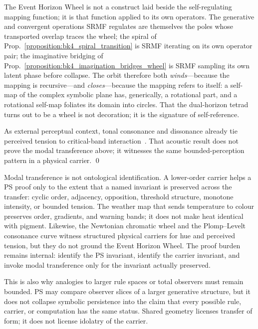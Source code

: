\begin{scholium}
\label{scholium:bk4_wheel_is_srmf_on_itself}
The Event Horizon Wheel is not a construct laid beside the self-regulating mapping
function; it is that function applied to its own operators. The generative and
convergent operations SRMF regulates are themselves the poles whose transported
overlap traces the wheel; the spiral of
Prop.~\ref{proposition:bk4_spiral_transition} is SRMF iterating on its own operator
pair; the imaginative bridging of
Prop.~\ref{proposition:bk4_imagination_bridges_wheel} is SRMF sampling its own latent
phase before collapse. The orbit therefore both \emph{winds}---because the mapping is
recursive---and \emph{closes}---because the mapping refers to itself: a self-map of
the complex symbolic plane has, generically, a rotational part, and a rotational
self-map foliates its domain into circles. That the dual-horizon tetrad turns out to
be a wheel is not decoration; it is the signature of self-reference.

As external perceptual context, tonal consonance and dissonance already tie
perceived tension to critical-band interaction~\cite{plomp1965tonal}. That
acoustic result does not prove the modal transference above; it witnesses the
same bounded-perception pattern in a physical carrier. \qed
\end{scholium}

\begin{remark}
\label{remark:bk4_invariant_limited_transfer}
Modal transference is not ontological identification. A lower-order carrier
helps a PS proof only to the extent that a named invariant is preserved across
the transfer: cyclic order, adjacency, opposition, threshold structure,
monotone intensity, or bounded tension. The weather map that sends temperature
to colour preserves order, gradients, and warning bands; it does not make heat
identical with pigment. Likewise, the Newtonian chromatic wheel and the
Plomp--Levelt consonance curve witness structured physical carriers for hue and
perceived tension, but they do not ground the Event Horizon Wheel. The proof
burden remains internal: identify the PS invariant, identify the carrier
invariant, and invoke modal transference only for the invariant actually
preserved.

This is also why analogies to larger rule spaces or total observers must remain
bounded. PS may compare observer slices of a larger generative structure, but
it does not collapse symbolic persistence into the claim that every possible
rule, carrier, or computation has the same status. Shared geometry licenses
transfer of form; it does not license idolatry of the carrier.
\end{remark}

